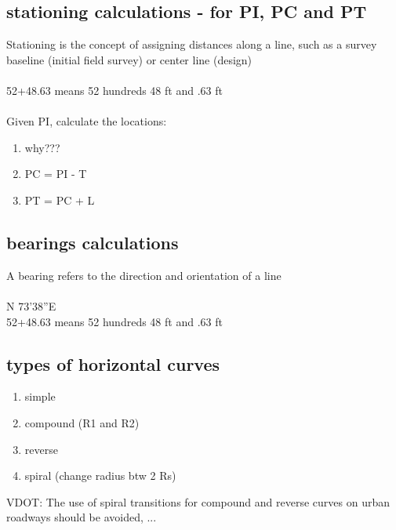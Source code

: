 \documentclass{article}
\begin{document}
  \subsection{stationing calculations - for PI, PC and PT}
  Stationing is the concept of assigning distances along a line, such as a survey baseline (initial field survey) or center line (design) \\
  \\
  52+48.63 means 52 hundreds 48 ft and .63 ft\\
  \\
  Given PI, calculate the locations:
  \begin{enumerate}
    \item why???
    \item PC = PI - T
    \item PT = PC + L
  \end{enumerate}


  \subsection{bearings calculations}
  A bearing refers to the direction and orientation of a line\\
  \\
  N 73'38''E
  \\
  52+48.63 means 52 hundreds 48 ft and .63 ft


  \subsection{types of horizontal curves}
  \begin{enumerate}
    \item simple 
    \item compound (R1 and R2)
    \item reverse 
    \item spiral (change radius btw 2 Rs)
  \end{enumerate}
  VDOT: The use of spiral transitions for compound and reverse curves on urban roadways should be avoided, ...
\end{document}
